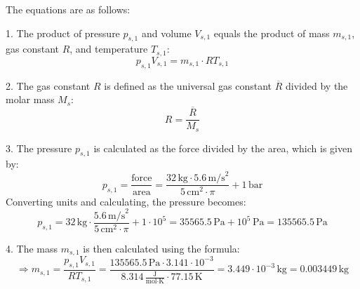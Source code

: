 The equations are as follows:

1. The product of pressure \( p_{s,1} \) and volume \( V_{s,1} \) equals the product of mass \( m_{s,1} \), gas constant \( R \), and temperature \( T_{s,1} \):
\[ p_{s,1} V_{s,1} = m_{s,1} \cdot R T_{s,1} \]

2. The gas constant \( R \) is defined as the universal gas constant \( \overline{R} \) divided by the molar mass \( M_s \):
\[ R = \frac{\overline{R}}{M_s} \]

3. The pressure \( p_{s,1} \) is calculated as the force divided by the area, which is given by:
\[ p_{s,1} = \frac{\text{force}}{\text{area}} = \frac{32 \, \text{kg} \cdot 5.6 \, \text{m/s}^2}{5 \, \text{cm}^2 \cdot \pi} + 1 \, \text{bar} \]
Converting units and calculating, the pressure becomes:
\[ p_{s,1} = 32 \, \text{kg} \cdot \frac{5.6 \, \text{m/s}^2}{5 \, \text{cm}^2 \cdot \pi} + 1 \cdot 10^5 = 35565.5 \, \text{Pa} + 10^5 \, \text{Pa} = 135565.5 \, \text{Pa} \]

4. The mass \( m_{s,1} \) is then calculated using the formula:
\[ \Rightarrow m_{s,1} = \frac{p_{s,1} V_{s,1}}{R T_{s,1}} = \frac{135565.5 \, \text{Pa} \cdot 3.141 \cdot 10^{-3}}{8.314 \, \frac{\text{J}}{\text{mol} \cdot \text{K}} \cdot 77.15 \, \text{K}} = 3.449 \cdot 10^{-3} \, \text{kg} = 0.003449 \, \text{kg} \]